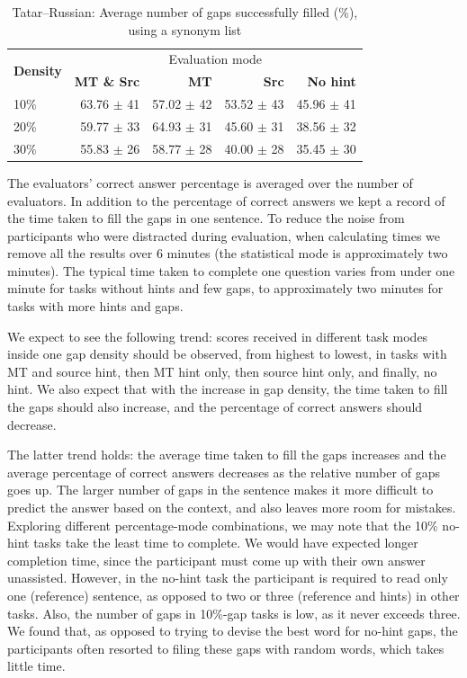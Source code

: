 \documentclass[11pt]{article}
\begin{document}
\begin{table}
\centering
  \begin{tabular}{|l|r|r|r|r|}
    \hline
    \multirow{2}{*}{\textbf{Density}} & \multicolumn{4}{|c|}{Evaluation mode} \\\cline{2-5}
                                            & \textbf{MT \& Src} & \textbf{MT} & \textbf{Src} & \textbf{No hint} \\
\hline
10\%&63.76 \(\pm\) 41&57.02 \(\pm\) 42&53.52 \(\pm\) 43&45.96 \(\pm\) 41\\
20\%&59.77 \(\pm\) 33&64.93 \(\pm\) 31&45.60 \(\pm\) 31&38.56 \(\pm\) 32\\
30\%&55.83 \(\pm\) 26&58.77 \(\pm\) 28&40.00 \(\pm\) 28&35.45 \(\pm\) 30\\
    \hline
  \end{tabular}
  \caption{Tatar--Russian: Average number of gaps successfully filled (\%), using a synonym list}
  \label{table:res-tat-rus}
\end{table}

The evaluators' correct answer percentage is averaged over the number of evaluators. In addition to the percentage of correct answers we kept a record of the time taken to fill the gaps in one sentence. To reduce the noise from participants who were distracted during evaluation, when
calculating times we remove all the results over 6 minutes (the statistical mode is approximately
two minutes). The typical time taken to complete one question varies from under one minute for tasks without hints and few gaps, to approximately two minutes for tasks with more hints and gaps. 

We expect to see the following trend: scores received in different task modes inside one gap density should be observed, from highest to lowest, in tasks with MT and source hint, then MT hint only, then source hint only, and finally, no hint. We also expect that with the increase in gap density, the time taken to fill the gaps should also increase, and the percentage of correct answers should decrease. 

The latter trend holds: the average time taken to fill the gaps increases and the average percentage of correct answers decreases as the relative number of gaps goes up. The larger number of gaps in the sentence makes it more
difficult to predict the answer based on the context, and also leaves more room for
mistakes. Exploring different percentage-mode combinations, we may note that the 10\% no-hint tasks take the least time to complete. We would have expected longer completion time, since the participant must come up with their own answer unassisted. However, in the no-hint task the participant is required to read only one (reference) sentence, as opposed to two or three (reference and hints) in other tasks. Also, the number of gaps in 10\%-gap tasks is low, as it never exceeds three. We found that, as opposed to trying to devise the best word for no-hint gaps, the participants often resorted to filing these gaps with random words, which takes little time.
\end{document}
